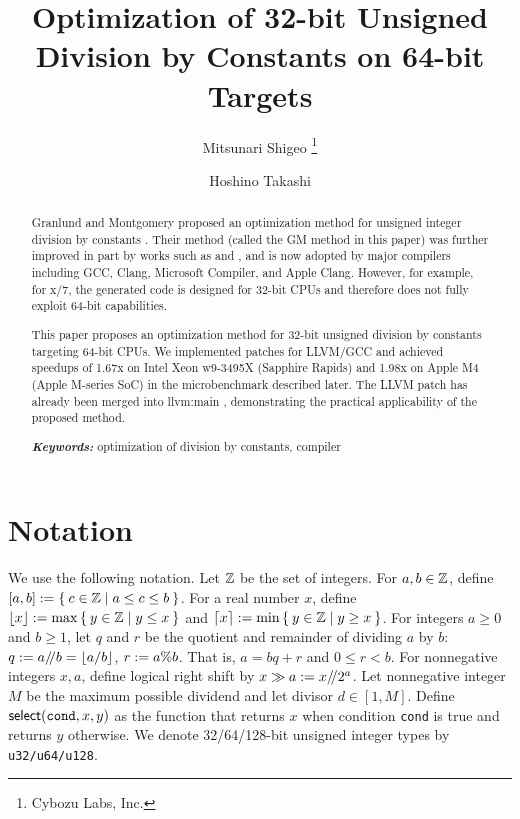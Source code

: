 \documentclass{article}
\begin{document}
\title{
  Optimization of 32-bit Unsigned Division by Constants on 64-bit Targets
}
\author{
    Mitsunari Shigeo
    \thanks{
        Cybozu Labs, Inc.
    }
    \and
    Hoshino Takashi
    \footnotemark[1]
}
\date{}
\maketitle

\begin{abstract}
Granlund and Montgomery proposed an optimization method for unsigned integer division by constants \cite{GM}.
Their method (called the GM method in this paper) was further improved in part by works such as \cite{CDW} and \cite{Hacker}, and is now adopted by major compilers including GCC, Clang, Microsoft Compiler, and Apple Clang.
However, for example, for x/7, the generated code is designed for 32-bit CPUs and therefore does not fully exploit 64-bit capabilities.

This paper proposes an optimization method for 32-bit unsigned division by constants targeting 64-bit CPUs.
We implemented patches for LLVM/GCC and achieved speedups of 1.67x on Intel Xeon w9-3495X (Sapphire Rapids) and 1.98x on Apple M4 (Apple M-series SoC) in the microbenchmark described later.
The LLVM patch has already been merged into llvm:main \cite{LLVMopt}, demonstrating the practical applicability of the proposed method. 

\noindent\emph{\bf Keywords:} optimization of division by constants, compiler
\end{abstract}

\section{Notation}
We use the following notation.
Let $\mathbb{Z}$ be the set of integers. For $a, b \in \mathbb{Z}$, define $[a, b] := \Set{c \in \mathbb{Z}\mid a \leq c \leq b}$.
For a real number $x$, define $\lfloor x \rfloor := \max \Set{y \in \mathbb{Z}\mid y \leq x}$ and $\lceil x \rceil := \min \Set{y \in \mathbb{Z}\mid y \geq x}$.
For integers $a \geq 0$ and $b \geq 1$, let $q$ and $r$ be the quotient and remainder of dividing $a$ by $b$: $q := a {\mathbin{/\mkern-4mu/}} b = \lfloor a/b \rfloor$, $r := a {\rm \% } b$.
That is, $a = bq + r$ and $0 \leq r < b$.
For nonnegative integers $x, a$, define logical right shift by $x \gg a := x {\mathbin{/\mkern-4mu/}} 2^a$.
Let nonnegative integer $M$ be the maximum possible dividend and let divisor $d \in [1, M]$.
Define $\mathsf{select}({\tt cond}, x, y)$ as the function that returns $x$ when condition {\tt cond} is true and returns $y$ otherwise.
We denote 32/64/128-bit unsigned integer types by {\tt u32/u64/u128}.
\end{document}
